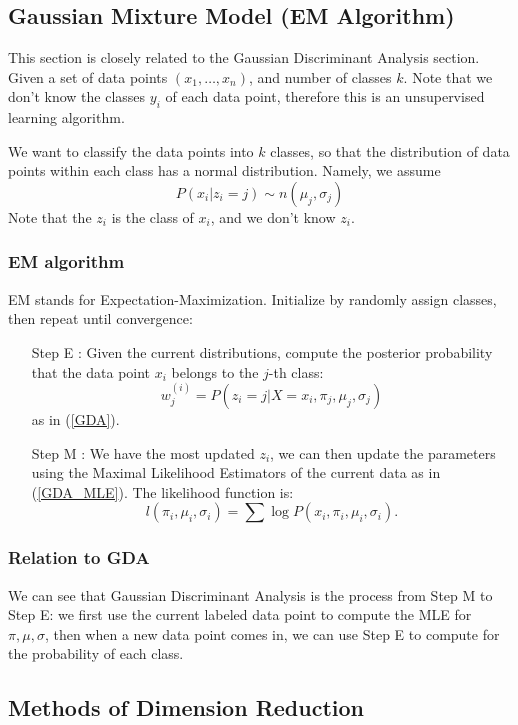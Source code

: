 \documentclass[12pt]{amsart}
\numberwithin{equation}{section}
\theoremstyle{plain}
\theoremstyle{definition}
\begin{document}
\subsection{Gaussian Mixture Model (EM Algorithm)}

This section is closely related to the Gaussian Discriminant Analysis section. Given a set of data points $(x_1,\ldots, x_n)$, and number of classes $k$. Note that we don't know the classes $y_i$ of each data point, therefore this is an unsupervised learning algorithm.

We want to classify the data points into $k$ classes, so that the distribution of data points within each class has a normal distribution. Namely, we assume 
$$
P(x_i|z_i=j) \sim n(\mu_j,\sigma_j)
$$
Note that the $z_i$ is the class of $x_i$, and we don't know $z_i$.

\subsubsection{EM algorithm}
EM stands for Expectation-Maximization. Initialize by randomly assign classes, then repeat until convergence:
\begin{itemize}
\item[Step E]: Given the current distributions, compute the posterior probability that the data point $x_i$ belongs to the $j$-th class:
$$
w_j^{(i)} = P(z_i = j| X = x_i, \pi_j, \mu_j, \sigma_j)
$$
as in (\ref{GDA}).

\item[Step M]: We have the most updated $z_i$, we can then update the parameters using the Maximal Likelihood Estimators of the current data as in (\ref{GDA_MLE}). The likelihood function is:
$$
l(\pi_i,\mu_i,\sigma_i) = \sum\log P(x_i, \pi_i,\mu_i,\sigma_i).
$$
\end{itemize}

\subsubsection{Relation to GDA}
We can see that Gaussian Discriminant Analysis is the process from Step M to Step E: we first use the current labeled data point to compute the MLE for $\pi, \mu, \sigma$, then when a new data point comes in, we can use Step E to compute for the probability of each class.

\subsection{Methods of Dimension Reduction}
\end{document}
